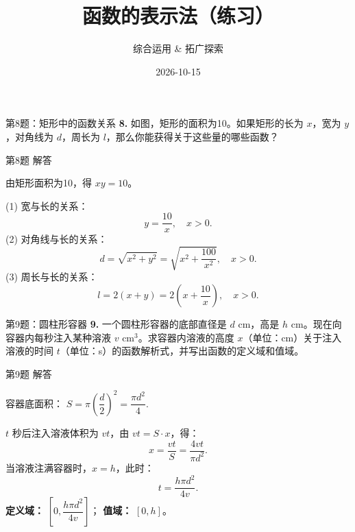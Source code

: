 \documentclass[10pt,aspectratio=169,serif]{beamer}
\title[函数的表示法练习]{函数的表示法（练习）}
\subtitle{综合运用 \& 拓广探索}
\author{}
\institute{}
\date{2026-10-15}
\begin{document}
\begin{frame}
  \titlepage
\end{frame}

\begin{frame}[t]{第8题：矩形中的函数关系}
\textbf{8.} 如图，矩形的面积为10。如果矩形的长为 $x$，宽为 $y$，对角线为 $d$，周长为 $l$，那么你能获得关于这些量的哪些函数？

\vspace{1em}
\begin{center}
\end{center}
\end{frame}

\begin{frame}[t]{第8题 解答}
\vspace{-2em}
\begin{tcolorbox}[colback=orange!10,colframe=orange,title=\textbf{解}]
由矩形面积为10，得 $xy = 10$。

\vspace{0em}
(1) 宽与长的关系：
\[
y = \frac{10}{x}, \quad x > 0.
\]
(2) 对角线与长的关系：
\[
d = \sqrt{x^2 + y^2} = \sqrt{x^2 + \frac{100}{x^2}}, \quad x > 0.
\]
(3) 周长与长的关系：
\[
l = 2(x + y) = 2\left(x + \frac{10}{x}\right), \quad x > 0.
\]
\end{tcolorbox}
\end{frame}

\begin{frame}[t]{第9题：圆柱形容器}
\textbf{9.} 一个圆柱形容器的底部直径是 $d$ cm，高是 $h$ cm。现在向容器内每秒注入某种溶液 $v$ cm$^3$。求容器内溶液的高度 $x$（单位：cm）关于注入溶液的时间 $t$（单位：s）的函数解析式，并写出函数的定义域和值域。
\end{frame}

\begin{frame}[t]{第9题 解答}
\vspace{-2em}
\begin{tcolorbox}[colback=orange!10,colframe=orange,title=\textbf{解}]
容器底面积：
$S = \pi \left(\dfrac{d}{2}\right)^2 = \dfrac{\pi d^2}{4}.$

$t$ 秒后注入溶液体积为 $vt$，由 $vt = S \cdot x$，得：
\[
x = \frac{vt}{S} = \frac{4vt}{\pi d^2}.
\]
当溶液注满容器时，$x = h$，此时：
\[
t = \frac{h\pi d^2}{4v}.
\]
\vspace{0.5em}
\textbf{定义域：} $[0 , \dfrac{h\pi d^2}{4v}]$；
\textbf{值域：} $[0 , h]$。
\end{tcolorbox}
\end{frame}
\end{document}

